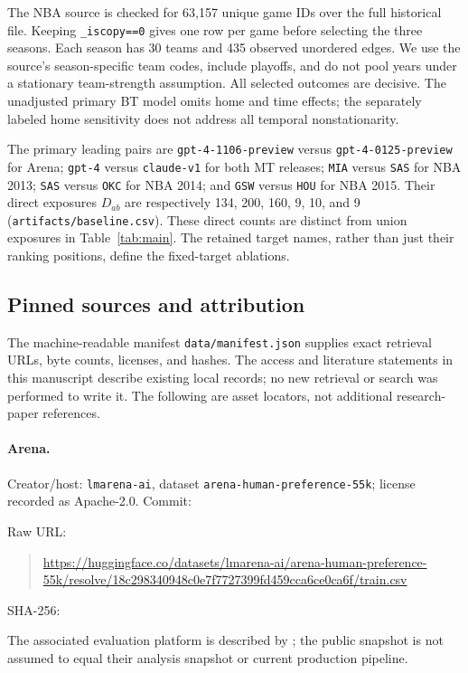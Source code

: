 The NBA source is checked for 63,157 unique game IDs over the full historical file. Keeping \texttt{\_iscopy==0} gives one row per game before selecting the three seasons. Each season has 30 teams and 435 observed unordered edges. We use the source's season-specific team codes, include playoffs, and do not pool years under a stationary team-strength assumption. All selected outcomes are decisive. The unadjusted primary BT model omits home and time effects; the separately labeled home sensitivity does not address all temporal nonstationarity.

The primary leading pairs are \texttt{gpt-4-1106-preview} versus \texttt{gpt-4-0125-preview} for Arena; \texttt{gpt-4} versus \texttt{claude-v1} for both MT releases; \texttt{MIA} versus \texttt{SAS} for NBA 2013; \texttt{SAS} versus \texttt{OKC} for NBA 2014; and \texttt{GSW} versus \texttt{HOU} for NBA 2015. Their direct exposures $D_{ab}$ are respectively 134, 200, 160, 9, 10, and 9 (\texttt{artifacts/baseline.csv}). These direct counts are distinct from union exposures in Table~\ref{tab:main}. The retained target names, rather than just their ranking positions, define the fixed-target ablations.

\subsection{Pinned sources and attribution}
\label{app:provenance}
The machine-readable manifest \texttt{data/manifest.json} supplies exact retrieval URLs, byte counts, licenses, and hashes. The access and literature statements in this manuscript describe existing local records; no new retrieval or search was performed to write it. The following are asset locators, not additional research-paper references.

\paragraph{Arena.}
Creator/host: \texttt{lmarena-ai}, dataset \texttt{arena-human-preference-55k}; license recorded as Apache-2.0. Commit:
\begin{quote}\small{}\end{quote}
Raw URL:
\begin{quote}\small\url{https://huggingface.co/datasets/lmarena-ai/arena-human-preference-55k/resolve/18c298340948c0e7f7727399fd459cca6ce0ca6f/train.csv}\end{quote}
SHA-256:
\begin{quote}\small{}\end{quote}
The associated evaluation platform is described by \citet{chiang2024chatbot}; the public snapshot is not assumed to equal their analysis snapshot or current production pipeline.

